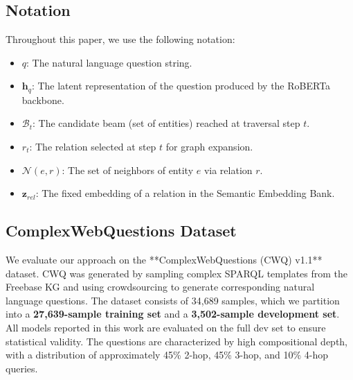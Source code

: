 \documentclass[11pt,a4paper]{article}
\begin{document}
\subsection{Notation}
Throughout this paper, we use the following notation:
\begin{itemize}
    \item $q$: The natural language question string.
    \item $\mathbf{h}_q$: The latent representation of the question produced by
          the RoBERTa backbone.
    \item $\mathcal{B}_t$: The candidate beam (set of entities) reached at
          traversal step $t$.
    \item $r_t$: The relation selected at step $t$ for graph expansion.
    \item $\mathcal{N}(e, r)$: The set of neighbors of entity $e$ via relation $r$.
    \item $\mathbf{z}_{rel}$: The fixed embedding of a relation in the Semantic
          Embedding Bank.
\end{itemize}

\subsection{ComplexWebQuestions Dataset}
We evaluate our approach on the **ComplexWebQuestions (CWQ) v1.1** dataset.
CWQ was generated by sampling complex SPARQL templates from the Freebase KG
and using crowdsourcing to generate corresponding natural language questions.
The dataset consists of 34,689 samples, which we partition into a
\textbf{27,639-sample training set} and a \textbf{3,502-sample development set}.
All models reported in this work are evaluated on the full dev set to ensure
statistical validity.
The questions are characterized by high compositional depth, with a
distribution of approximately 45\% 2-hop, 45\% 3-hop, and 10\% 4-hop queries.
\end{document}
